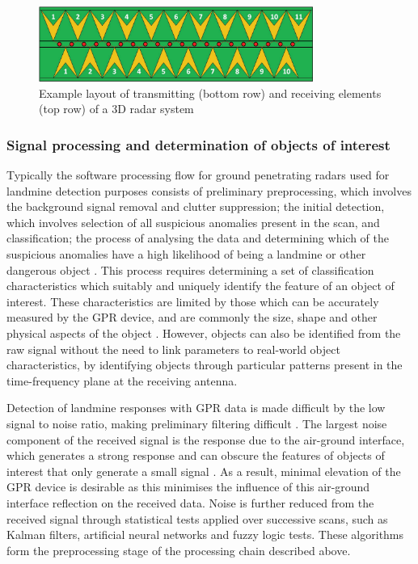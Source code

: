\documentclass[main.tex]{subfiles}
\begin{document}
\begin{figure}[ht]
\centering
\includegraphics[width=0.8\textwidth]{2-LiteratureReview/3d-radar.png}
\caption[Example layout of transmitting and receiving elements of a 3D radar system]{Example layout of transmitting (bottom row) and receiving elements (top row) of a 3D radar system \parencite{3dradarDXG}}
\end{figure}

\subsubsection{Signal processing and determination of objects of interest}
Typically the software processing flow for ground penetrating radars used for landmine detection purposes consists of preliminary preprocessing, which involves the background signal removal and clutter suppression; the initial detection, which involves selection of all suspicious anomalies present in the scan, and classification; the process of analysing the data and determining which of the suspicious anomalies have a high likelihood of being a landmine or other dangerous object \parencite{Ho.etal2004}. This process requires determining a set of classification characteristics which suitably and uniquely identify the feature of an object of interest. These characteristics are limited by those which can be accurately measured by the GPR device, and are commonly the size, shape and other physical aspects of the object \parencite{Ho2008}. However, objects can also be identified from the raw signal without the need to link parameters to real-world object characteristics, by identifying objects through particular patterns present in the time-frequency plane at the receiving antenna.

Detection of landmine responses with GPR data is made difficult by the low signal to noise ratio, making preliminary filtering difficult \parencite{shresta2003}. The largest noise component of the received signal is the response due to the air-ground interface, which generates a strong response and can obscure the features of objects of interest that only generate a small signal \parencite{Yarovoy2009}. As a result, minimal elevation of the GPR device is desirable as this minimises the influence of this air-ground interface reflection on the received data. Noise is further reduced from the received signal through statistical tests applied over successive scans, such as Kalman filters, artificial neural networks and fuzzy logic tests. These algorithms form the preprocessing stage of the processing chain described above.
\end{document}
